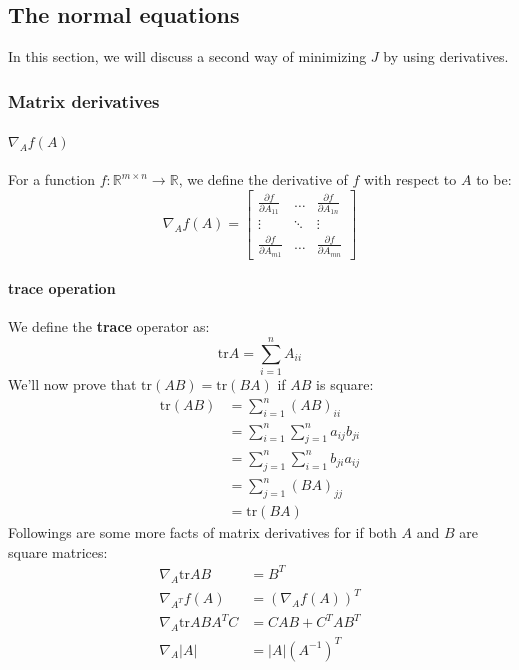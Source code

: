 \documentclass{article}
\begin{document}
\subsection{The normal equations}
In this section, we will discuss a second way of minimizing $J$ by using derivatives.
\subsubsection{Matrix derivatives}
\paragraph{$\nabla_A f(A)$} For a function $f: \mathbb{R}^{m \times n} \rightarrow \mathbb{R}$, we define the derivative of $f$ with respect to $A$ to be:
\begin{equation}
	\label{eq:gradient_definition}
	\nabla_A f(A) =
	\begin{bmatrix}
		\frac{\partial f}{\partial A_{11}} & \ldots & \frac{\partial f}{\partial A_{1n}} \\
		\vdots & \ddots & \vdots \\
		\frac{\partial f}{\partial A_{m1}} & \ldots & \frac{\partial f}{\partial A_{mn}}
	\end{bmatrix}
\end{equation}
\paragraph{trace operation} We define the {\bf trace} operator as:
\begin{equation}
	\label{eq:trace_definition}
	\text{tr} A = \sum_{i=1}^{n}A_{ii}
\end{equation}
We'll now prove that $\text{tr} (AB) = \text{tr} (BA)$ if $AB$ is square:
\begin{align*}
	\text{tr} (AB) &= \sum_{i=1}^{n}(AB)_{ii} \\
	&= \sum_{i=1}^{n}\sum_{j=1}^{n}a_{ij}b_{ji} \\
	&= \sum_{j=1}^{n}\sum_{i=1}^{n}b_{ji}a_{ij} \\
	&= \sum_{j=1}^{n}(BA)_{jj} \\
	&= \text{tr} (BA)
\end{align*}
Followings are some more facts of matrix derivatives for if both $A$ and $B$ are square matrices:
\begin{align}
	\label{eq:gradient_equations}
	\nabla_A \text{tr} AB &= B^T \\
	\nabla_{A^T} f(A) &= \left(\nabla_A f(A)\right)^T \\
	\nabla_A \text{tr} ABA^TC &= CAB + C^TAB^T \\
	\nabla_A |A| &= |A| \left(A^{-1}\right)^T
\end{align}
\end{document}
